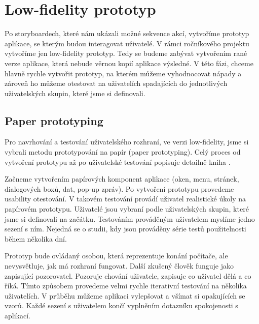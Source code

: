 \chapter{Low-fidelity prototyp}



Po storyboardech, které nám ukázali možné sekvence akcí, vytvoříme prototyp aplikace, se kterým budou interagovat uživatelé. V rámci ročníkového projektu vytvoříme jen low-fidelity prototyp. Tedy se budeme zabývat vytvořením rané verze aplikace, která nebude věrnou kopií aplikace výsledné. V této fázi, chceme hlavně rychle vytvořit prototyp, na kterém můžeme vyhodnocovat nápady a zároveň ho můžeme otestovat na uživatelích spadajících do jednotlivých uživatelských skupin, které jsme si definovali.

\section{Paper prototyping}

Pro navrhování a testování uživatelského rozhraní, ve verzi low-fidelity, jsme si vybrali metodu prototypování na papír (paper prototyping). Celý proces od vytvoření prototypu až po uživatelské testování popisuje detailně kniha \cite{Paper_Prototyping}.

Začneme vytvořením papírových komponent aplikace (oken, menu, stránek, dialogových boxů, dat, pop-up zpráv). 
Po vytvoření prototypu provedeme usability otestování.
V takovém testování provádí uživatel realistické úkoly na papírovém prototypu. Uživatelé jsou vybraní podle uživatelských skupin, které jsme si definovali na začátku.
Testováním prováděným uživatelem myslíme jedno sezení s ním. Nejedná se o studii, kdy jsou prováděny série testů použitelnosti během několika dní.

Prototyp bude ovládaný osobou, která reprezentuje konání počítače, ale nevysvětluje, jak má rozhraní fungovat. Další zkušený člověk funguje jako zapisující pozorovatel. Pozoruje chování uživatele, zapisuje co uživatel dělá a co říká. Tímto způsobem provedeme velmi rychle iterativní testování na několika uživatelích. V průběhu můžeme aplikaci vylepšovat a všímat si opakujících se vzorů. Každé sezení s uživatelem končí vyplněním dotazníku spokojenosti s aplikací.

